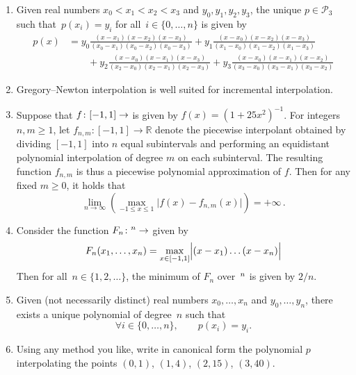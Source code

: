 \documentclass[a4paper]{article}
\begin{document}
\begin{enumerate}

    \item
        Given real numbers $x_0 < x_1 < x_2 < x_3$ and $y_0, y_1, y_2, y_3$,
        the unique $p \in \mathcal P_3$ such that~$p(x_i) = y_i$ for all~$i \in \{0, \dotsc, n\}$ is given by
        \begin{align*}
            p(x) &= y_0 \frac{(x-x_1)(x-x_2)(x-x_3)}{(x_0-x_1)(x_0-x_2)(x_0-x_3)}
            + y_1 \frac{(x-x_0)(x-x_2)(x-x_3)}{(x_1-x_0)(x_1-x_2)(x_1-x_3)} \\
                 &\qquad
            + y_2 \frac{(x-x_0)(x-x_1)(x-x_3)}{(x_2-x_0)(x_2-x_1)(x_2-x_3)}
            + y_3 \frac{(x-x_0)(x-x_1)(x-x_2)}{(x_3-x_0)(x_3-x_1)(x_3-x_2)}
        \end{align*}

    \item
        Gregory--Newton interpolation is well suited for incremental interpolation.

    \item
        Suppose that $f\colon[-1, 1] \to \real$ is given by $f(x) = (1 + 25x^2)^{-1}$.
        For integers \(n, m \ge 1\), let \(f_{n,m}: [-1,1] \to \mathbb{R}\) denote the piecewise interpolant obtained by dividing \([-1,1]\) into \(n\) equal subintervals and performing an equidistant polynomial interpolation of degree \(m\) on each subinterval. The resulting function \(f_{n,m}\) is thus a piecewise polynomial approximation of \(f\).
        Then for any fixed $m \geq 0$, it holds that
        \[
            \lim_{n \to \infty} \left( \max_{-1 \leq x \leq 1} \bigl\lvert f(x) - f_{n,m}(x) \bigr\rvert \right) = + \infty \, .
        \]

    \item
        Consider the function $F_n \colon \real^n \to \real$ given by
        \[
            F_n(x_1, \dotsc, x_n) = \max_{x\in [-1, 1]} \Bigl\lvert (x - x_1) \dotsc  (x - x_n) \Bigr\rvert
        \]
        Then for all~$n \in \{1, 2, \dotsc\}$, the minimum of $F_n$ over~$\real^n$ is given by $2/n$.

    \item
        Given (not necessarily distinct) real numbers $x_0, \dotsc, x_n$ and $y_0, \dotsc, y_n$,
        there exists a unique polynomial of degree~$n$ such that
        \[
            \forall i \in \{0, \dotsc, n\}, \qquad
            p(x_i) = y_i.
        \]

    \item
        Using any method you like, write in canonical form the polynomial $p$ interpolating
        the points $(0, 1)$, $(1, 4)$, $(2, 15)$, $(3, 40)$.


\end{enumerate}
\end{document}
